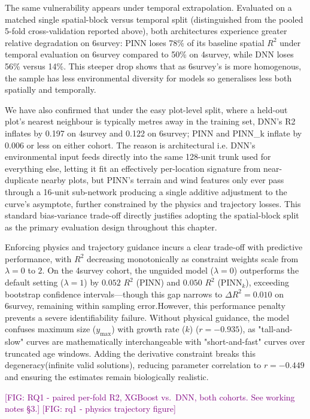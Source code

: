 \documentclass[logo,msc,ai]{infthesis}           %
\newcommand{\fig}[1]{\textcolor{purple}{[FIG: #1]}}
\begin{document}
The same vulnerability appears under temporal extrapolation. Evaluated on a matched single spatial-block versus temporal split (distinguished from the pooled 5-fold cross-validation reported above), both architectures experience greater relative degradation on 6survey: PINN loses 78\% of its baseline spatial $R^2$ under temporal evaluation on 6survey compared to 50\% on 4survey, while DNN loses 56\% versus 14\%. 
This steeper drop shows that as 6survey's is more homogenous, the sample has less environmental diversity for models so generalises less both spatially and temporally.

We have also confirmed that under the easy plot-level split, where a held-out plot's nearest
neighbour is typically metres away in the training set, DNN's R2 inflates by 0.197 on
4survey and 0.122 on 6survey; PINN and PINN\_k inflate by 0.006 or less on either
cohort. The reason is architectural i.e. DNN's environmental input feeds directly into the
same 128-unit trunk used for everything else, letting it fit an effectively
per-location signature from near-duplicate nearby plots, but PINN's terrain and wind
features only ever pass through a 16-unit sub-network producing a single additive
adjustment to the curve's asymptote, further constrained by the physics and trajectory
losses. This standard bias-variance trade-off directly justifies adopting the spatial-block split as the primary evaluation design throughout this chapter.

Enforcing physics and trajectory guidance incurs a clear trade-off with predictive performance, with $R^2$ decreasing monotonically as constraint weights scale from $\lambda = 0$ to $2$. On the 4survey cohort, the unguided model ($\lambda = 0$) outperforms the default setting ($\lambda = 1$) by $0.052$ $R^2$ (PINN) and $0.050$ $R^2$ ($\text{PINN}_k$), exceeding bootstrap confidence intervals—though this gap narrows to $\Delta R^2 = 0.010$ on 6survey, remaining within sampling error.However, this performance penalty prevents a severe identifiability failure. Without physical guidance, the model confuses maximum size ($y_{\max}$) with growth rate ($k$) ($r = -0.935$), as "tall-and-slow" curves are mathematically interchangeable with "short-and-fast" curves over truncated age windows. Adding the derivative constraint breaks this degeneracy(infinite valid solutions), reducing parameter correlation to $r = -0.449$ and ensuring the estimates remain biologically realistic.

\fig{RQ1 - paired per-fold R2, XGBoost vs.\ DNN, both cohorts. See working notes \S3.}
\fig{rq1 - physics trajectory figure}
\end{document}
